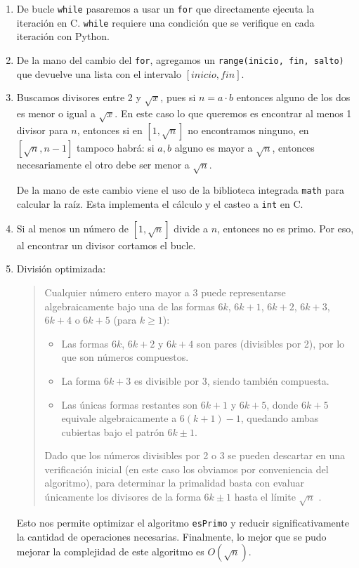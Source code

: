 \documentclass[12pt,a4paper]{article}
\begin{document}
\begin{enumerate}
  \item De bucle \texttt{while} pasaremos a usar un \texttt{for} que directamente ejecuta la iteración en C. \texttt{while} requiere una condición que se verifique en cada iteración con Python.

  \item De la mano del cambio del \texttt{for}, agregamos un \texttt{range(inicio, fin, salto)} que devuelve una lista con el intervalo $[inicio, fin]$.

  \item Buscamos divisores entre 2 y $\sqrt{x}$, pues si $n = a \cdot b$ entonces alguno de los dos es menor o igual a $\sqrt{x}$. En este caso lo que queremos es encontrar al menos 1 divisor para $n$, entonces si en $[1, \sqrt{n}]$ no encontramos ninguno, en $[\sqrt{n}, n-1]$ tampoco habrá: si $a, b$ alguno es mayor a $\sqrt{n}$, entonces necesariamente el otro debe ser menor a $\sqrt{n}$.

  De la mano de este cambio viene el uso de la biblioteca integrada \texttt{math} para calcular la raíz. Esta implementa el cálculo y el casteo a \texttt{int} en C.

  \item Si al menos un número de $[1, \sqrt{n}]$ divide a $n$, entonces no es primo. Por eso, al encontrar un divisor cortamos el bucle.

  \item División optimizada:
  \begin{quote}
    Cualquier número entero mayor a 3 puede representarse algebraicamente bajo una de las formas $6k$, $6k+1$, $6k+2$, $6k+3$, $6k+4$ o $6k+5$ (para $k \ge 1$):
    \begin{itemize}
      \item Las formas $6k$, $6k+2$ y $6k+4$ son pares (divisibles por 2), por lo que son números compuestos.
      \item La forma $6k+3$ es divisible por 3, siendo también compuesta.
      \item Las únicas formas restantes son $6k+1$ y $6k+5$, donde $6k+5$ equivale algebraicamente a $6(k+1)-1$, quedando ambas cubiertas bajo el patrón $6k \pm 1$.
    \end{itemize}
    Dado que los números divisibles por 2 o 3 se pueden descartar en una verificación inicial (en este caso los obviamos por conveniencia del algoritmo), para determinar la primalidad basta con evaluar únicamente los divisores de la forma $6k \pm 1$ hasta el límite $\sqrt{n}$ \cite{geeksforgeeks}.
  \end{quote}

  Esto nos permite optimizar el algoritmo \texttt{esPrimo} y reducir significativamente la cantidad de operaciones necesarias. Finalmente, lo mejor que se pudo mejorar la complejidad de este algoritmo es $O(\sqrt{n})$.
\end{enumerate}
\end{document}
